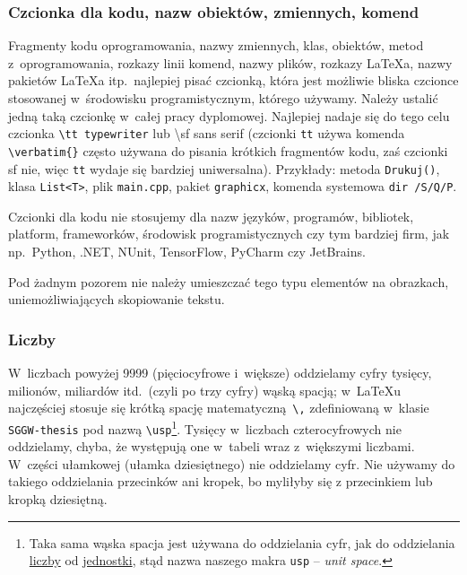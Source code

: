 \subsubsection{Czcionka dla kodu, nazw obiektów, zmiennych, komend}
\label{sec:dod:czcionka-kodu}

Fragmenty kodu oprogramowania, nazwy zmiennych, klas, obiektów, metod z~oprogramowania, rozkazy linii komend, nazwy plików, rozkazy \LaTeX{}a, nazwy pakietów \LaTeX{}a itp.\ najlepiej pisać czcionką, która jest możliwie bliska czcionce stosowanej w~środowisku programistycznym, którego używamy. Należy ustalić jedną taką czcionkę w~całej pracy dyplomowej. Najlepiej nadaje się do tego celu czcionka {\tt \textbackslash{}tt typewriter} lub {\sf \textbackslash{}sf sans serif} (czcionki {\tt \tbs{}tt} używa komenda \verb+\verbatim{}+ często używana do pisania krótkich fragmentów kodu, zaś czcionki {\sf \tbs{}sf} nie, więc {\tt \tbs{}tt} wydaje się bardziej uniwersalna). Przykłady: metoda {\tt Drukuj()}, klasa {\tt List<T>}, plik {\tt main.cpp}, pakiet {\tt graphicx}, komenda systemowa {\tt dir /S/Q/P}. 

Czcionki dla kodu nie stosujemy dla nazw języków, programów, bibliotek, platform, frameworków, środowisk programistycznych czy tym bardziej firm, jak np.\ Python, .NET, NUnit, TensorFlow, PyCharm czy JetBrains.

Pod żadnym pozorem nie należy umieszczać tego typu elementów na obrazkach, uniemożliwiających skopiowanie tekstu.


\subsubsection{Liczby}
\label{sec:dod:liczby}

W~liczbach powyżej 9999 (pięciocyfrowe i~większe) oddzielamy cyfry tysięcy, milionów, miliardów itd.\ (czyli po trzy cyfry) wąską spacją; w~\LaTeX{}u najczęściej stosuje się krótką spację matematyczną~\verb+\,+ zdefiniowaną w~klasie {\tt SGGW-thesis} pod nazwą \verb+\usp+\footnote{\label{not:waska-spacja}Taka sama wąska spacja jest używana do oddzielania cyfr, jak do oddzielania \hyperref[sec:dod:liczby]{liczby} od  \hyperref[sec:dod:jednostki]{jednostki}, stąd nazwa naszego makra {\tt \tbs{}usp} -- {\em unit space}.}. Tysięcy w~liczbach czterocyfrowych nie oddzielamy, chyba, że występują one w~tabeli wraz z~większymi liczbami. W~części ułamkowej (ułamka dziesiętnego) nie oddzielamy cyfr. Nie używamy do takiego oddzielania przecinków ani kropek, bo myliłyby się z przecinkiem lub kropką dziesiętną.

